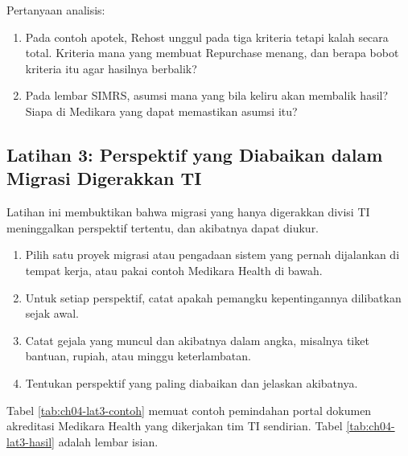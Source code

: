 Pertanyaan analisis:
\begin{enumerate}
  \item Pada contoh apotek, Rehost unggul pada tiga kriteria tetapi kalah secara total.
        Kriteria mana yang membuat Repurchase menang, dan berapa bobot kriteria itu agar
        hasilnya berbalik?
  \item Pada lembar SIMRS, asumsi mana yang bila keliru akan membalik hasil? Siapa di
        Medikara yang dapat memastikan asumsi itu?
\end{enumerate}

\subsection*{Latihan 3: Perspektif yang Diabaikan dalam Migrasi Digerakkan TI}

Latihan ini membuktikan bahwa migrasi yang hanya digerakkan divisi TI meninggalkan
perspektif tertentu, dan akibatnya dapat diukur.

\begin{enumerate}
  \item Pilih satu proyek migrasi atau pengadaan sistem yang pernah dijalankan di tempat
        kerja, atau pakai contoh Medikara Health di bawah.
  \item Untuk setiap perspektif, catat apakah pemangku kepentingannya dilibatkan sejak
        awal.
  \item Catat gejala yang muncul dan akibatnya dalam angka, misalnya tiket bantuan,
        rupiah, atau minggu keterlambatan.
  \item Tentukan perspektif yang paling diabaikan dan jelaskan akibatnya.
\end{enumerate}

Tabel \ref{tab:ch04-lat3-contoh} memuat contoh pemindahan portal dokumen akreditasi
Medikara Health yang dikerjakan tim TI sendirian. Tabel \ref{tab:ch04-lat3-hasil} adalah
lembar isian.

